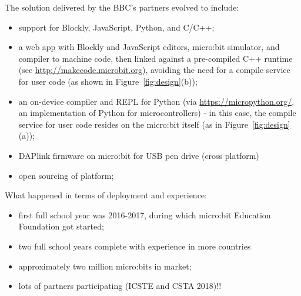 
The solution delivered by the BBC's partners evolved to include:
\begin{itemize}
\item support for Blockly, JavaScript, Python, and C/C++;
\item a web app with Blockly and JavaScript editors, micro:bit simulator, 
and compiler to machine code, then linked against a pre-compiled C++ runtime 
(see \url{http://makecode.microbit.org}), 
avoiding the need for a compile service for user code (as shown 
in Figure~\ref{fig:design}(b));
\item an on-device compiler and REPL for Python (via \url{https://micropython.org/}, 
an implementation of Python for microcontrollers) - in this case, the
compile service for user code resides on the micro:bit itself (as in
Figure~\ref{fig:design}(a));
\item DAPlink firmware on micro:bit for USB pen drive (cross platform)
\item open sourcing of platform;
\end{itemize}
What happened in terms of deployment and experience:
\begin{itemize}
\item first full school year was 2016-2017, during which micro:bit Education Foundation got
started; 
\item two full school years complete with experience in more countries
\item approximately two million micro:bits in market;
\item lots of partners participating (ICSTE and CSTA 2018)!!
\end{itemize}




